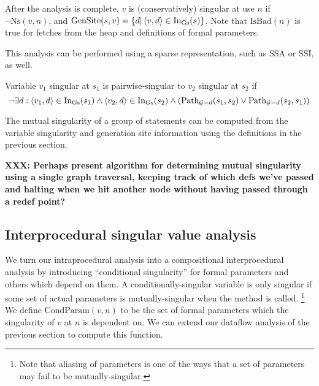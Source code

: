 \documentclass[11pt,notitlepage]{article}
\begin{document}
After the analysis is complete, $v$ is (conservatively) singular at
use $n$ if $\neg\text{Ns}(v,n)$, and 
$\text{GenSite}(s,v)=\left\{ d | \left\langle v,d \right\rangle\in\text{In}_\text{Gs}(s) \right\}$.
Note that $\text{IsBad}(n)$ is true for fetches from the heap and
definitions of formal parameters.

This analysis can be performed using a sparse representation, such as
SSA or SSI, as well.

Variable $v_1$ singular at $s_1$ is pairwise-singular to $v_2$
singular at $s_2$ if
\begin{displaymath}
\neg\exists 
     d : \left\langle v_1, d \right\rangle \in \text{In}_\text{Gs}(s_1) \wedge
         \left\langle v_2, d \right\rangle \in \text{In}_\text{Gs}(s_2) \wedge
\left(\text{Path}_{\mathcal{G}-d}(s_1, s_2) \vee
      \text{Path}_{\mathcal{G}-d}(s_2, s_1) \right)
\end{displaymath}

The mutual singularity of a group of statements can be computed from
the variable singularity and generation site information using the
definitions in the previous section.

\textbf{XXX: Perhaps present algorithm for determining mutual
singularity using a single graph traversal, keeping track of which
defs we've passed and halting when we hit another node without
having passed through a redef point?}

\subsection{Interprocedural singular value analysis}

We turn our intraprocedural analysis into a compositional
interprocedural analysis by introducing ``conditional singularity''
for formal parameters and others which depend on them.  A
conditionally-singular variable is only singular if some set of actual
parameters is mutually-singular when the method is called.%
\footnote{Note that aliasing of parameters is one of the ways that
a set of parameters may fail to be mutually-singular.}
We define
$\text{CondParam}(v,n)$ to be the set of formal parameters which the
singularity of $v$ at $n$ is dependent on.  We can extend our dataflow
analysis of the previous section to compute this function.
\end{document}
